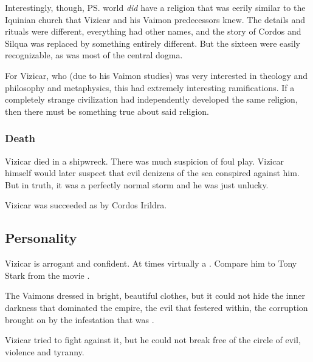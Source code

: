Interestingly, though, \ps{\Tydesmos} world \emph{did} have a religion that was eerily similar to the Iquinian church that Vizicar and his Vaimon predecessors knew. 
The details and rituals were different, everything had other names, and the story of Cordos and Silqua was replaced by something entirely different.
But the sixteen \sephiroth{} were easily recognizable, as was most of the central dogma. 

For Vizicar, who (due to his Vaimon studies) was very interested in theology and philosophy and metaphysics, this had extremely interesting ramifications. 
If a completely strange civilization had independently developed the same religion, then there must be something true about said religion. 





\subsubsection{Death}
Vizicar died in a shipwreck.
There was much suspicion of foul play. 
Vizicar himself would later suspect that evil denizens of the sea conspired against him. 
But in truth, it was a perfectly normal storm and he was just unlucky.

Vizicar was succeeded as \VaimonCaliph by Cordos Irildra. 









\subsection{Personality}
Vizicar is arrogant and confident. 
At times virtually a . 
Compare him to Tony Stark from the movie \cite{Movie:IronMan}. 

The Vaimons dressed in bright, beautiful clothes, but it could not hide the inner darkness that dominated the empire, the evil that festered within, the corruption brought on by the infestation that was \iquin. 

Vizicar tried to fight against it, but he could not break free of the circle of evil, violence and tyranny. 





